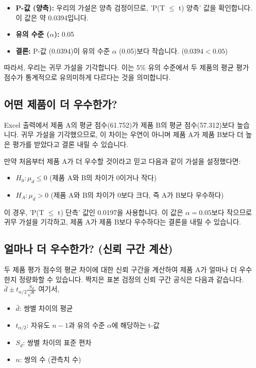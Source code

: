 \documentclass[11pt,a4paper]{article}
\theoremstyle{definition}
\begin{document}
\begin{itemize}
    \item \textbf{P-값 (양측):} 우리의 가설은 양측 검정이므로, 'P(T $\le$ t) 양측' 값을 확인합니다. 이 값은 약 0.0394입니다.
    \item \textbf{유의 수준 ($\alpha$):} 0.05
    \item \textbf{결론:} P-값 (0.0394)이 유의 수준 $\alpha$ (0.05)보다 작습니다. ($0.0394 < 0.05$)
\end{itemize}
따라서, 우리는 귀무 가설을 기각합니다. 이는 5\% 유의 수준에서 두 제품의 평균 평가 점수가 통계적으로 유의미하게 다르다는 것을 의미합니다.

\subsection{어떤 제품이 더 우수한가?}
Excel 출력에서 제품 A의 평균 점수(61.752)가 제품 B의 평균 점수(57.312)보다 높습니다. 귀무 가설을 기각했으므로, 이 차이는 우연이 아니며 제품 A가 제품 B보다 더 높은 평가를 받았다고 결론 내릴 수 있습니다.

\begin{examplebox}[title=단측 검정으로 가설을 설정했다면?]
만약 처음부터 제품 A가 더 우수할 것이라고 믿고 다음과 같이 가설을 설정했다면:
\begin{itemize}
    \item $H_0: \mu_d \le 0$ (제품 A와 B의 차이가 0이거나 작다)
    \item $H_A: \mu_d > 0$ (제품 A와 B의 차이가 0보다 크다, 즉 A가 B보다 우수하다)
\end{itemize}
이 경우, 'P(T $\le$ t) 단측' 값인 0.0197을 사용합니다. 이 값은 $\alpha=0.05$보다 작으므로 귀무 가설을 기각하고, 제품 A가 제품 B보다 우수하다는 결론을 내릴 수 있습니다.
\end{examplebox}

\subsection{얼마나 더 우수한가? (신뢰 구간 계산)}
두 제품 평가 점수의 평균 차이에 대한 신뢰 구간을 계산하여 제품 A가 얼마나 더 우수한지 정량화할 수 있습니다. 짝지은 표본 검정의 신뢰 구간 공식은 다음과 같습니다.
$\bar{d} \pm t_{\alpha/2} \frac{S_d}{\sqrt{n}}$
여기서,
\begin{itemize}
    \item $\bar{d}$: 쌍별 차이의 평균
    \item $t_{\alpha/2}$: 자유도 $n-1$과 유의 수준 $\alpha$에 해당하는 t-값
    \item $S_d$: 쌍별 차이의 표준 편차
    \item $n$: 쌍의 수 (관측치 수)
\end{itemize}
\end{document}
